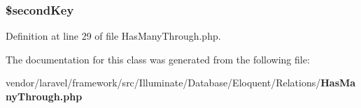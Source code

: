 \subsubsection[{\$second\+Key}]{\setlength{\rightskip}{0pt plus 5cm}\$second\+Key\hspace{0.3cm}{\ttfamily [protected]}}\label{class_illuminate_1_1_database_1_1_eloquent_1_1_relations_1_1_has_many_through_a22d5999fe29a431a3a31f982c3540109}


Definition at line 29 of file Has\+Many\+Through.\+php.



The documentation for this class was generated from the following file\+:\begin{DoxyCompactItemize}
\item 
vendor/laravel/framework/src/\+Illuminate/\+Database/\+Eloquent/\+Relations/{\bf Has\+Many\+Through.\+php}\end{DoxyCompactItemize}
